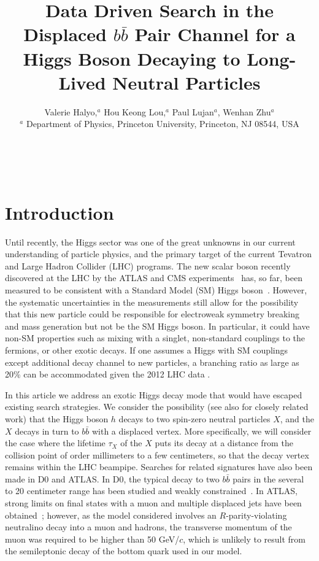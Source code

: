 \documentclass{JHEP3}
\title{Data Driven Search in the Displaced $b\bar{b}$ Pair Channel for a Higgs Boson Decaying to Long-Lived Neutral Particles}
\author{Valerie Halyo,$^a$ Hou Keong Lou,$^a$ Paul Lujan$^a$, Wenhan Zhu$^a$\\
$^a$ Department of Physics, Princeton University, Princeton, NJ 08544, USA\\
\email{valerieh@princeton.edu}\\
\email{hlou@princeton.edu}\\
\email{plujan@princeton.edu}\\
\email{wenhanz@princeton.edu}
}
\begin{document}
\section{Introduction}
\label{sec:intro}


Until recently, the Higgs sector was one of the great unknowns in our current understanding of particle
physics, and the primary target of the current Tevatron and Large Hadron Collider (LHC) programs. The new
scalar boson recently discovered at the LHC by the ATLAS and CMS
experiments~\cite{Aad:2012tfa,Chatrchyan:2012ufa} has, so far, been measured to be consistent with a Standard
Model (SM) Higgs boson~\cite{ATLAS:2013sla,CMS:yva}. However, the systematic uncertainties in the measurements
still allow for the possibility that this new particle could be responsible for electroweak symmetry breaking
and mass generation but not be the SM Higgs boson.  In particular, it could have non-SM properties such as
mixing with a singlet, non-standard couplings to the fermions, or other exotic decays. 
If one assumes a Higgs with SM couplings except additional decay channel to new particles, a branching ratio as large as 20\% can be accommodated given the 2012 LHC data \cite{Belanger:2013kya,Ellis:2013lra}.

In this article we address an exotic Higgs decay mode that would have escaped existing search strategies.  We
consider the possibility \cite{Strassler:2006ri} (see also \cite{Chang:2005ht,Carpenter:2007zz} for closely
related work) that the Higgs boson $h$ decays to two spin-zero neutral particles $X$, and the $X$ decays in
turn to $b\bar b$ with a displaced vertex.  More specifically, we will consider the case where the lifetime
$\tau_X$ of the $X$ puts its decay at a distance from the collision point of order millimeters to a few
centimeters, so that the decay vertex remains within the LHC beampipe. Searches for related signatures have
also been made in D0 and ATLAS. In D0, the typical decay to two $b\bar{b}$ pairs in the several to 20
centimeter range has been studied and weakly constrained~\cite{Abazov:2009ik}. In ATLAS, strong limits on
final states with a muon and multiple displaced jets have been obtained~\cite{Aad:2012zx}; however, as the
model considered involves an $R$-parity-violating neutralino decay into a muon and hadrons, the transverse
momentum of the muon was required to be higher than 50 GeV/$c$, which is unlikely to result from the
semileptonic decay of the bottom quark used in our model.
\end{document}
